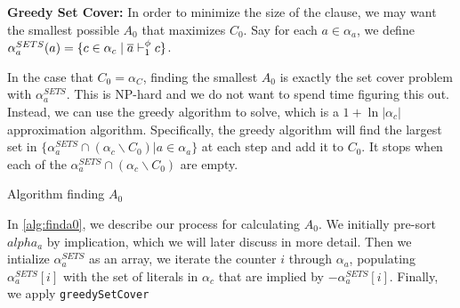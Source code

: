 \noindent \textbf{Greedy Set Cover:} %
In order to minimize the size of the clause, we may want the smallest possible $A_0$ that maximizes $C_0$. Say for each $a \in \alpha_a$, we define $\alpha_a^{SETS}(a) = \{ c \in \alpha_c \; | \; \overline{a} \vdash_1^\phi c\}$. 

In the case that $C_0 = \alpha_C$, finding the smallest $A_0$ is exactly the set cover problem with $\alpha_a^{SETS}$. This is NP-hard and we do not want to spend time figuring this out. Instead, we can use the greedy algorithm to solve, which is a $1 + \ln |\alpha_c|$ approximation algorithm. Specifically, the greedy algorithm will find the largest set in $\{\alpha_a^{SETS} \cap (\alpha_c \backslash C_0) | a \in \alpha_a \}$ at each step and add it to $C_0$. It stops when each of the $\alpha_a^{SETS} \cap (\alpha_c \backslash C_0)$ are empty.


\begin{algorithm}
    \caption{Algorithm finding $A_0$}\label{alg:finda0}
    \SetAlgoNoLine
\end{algorithm}

In \autoref{alg:finda0}, we describe our process for calculating $A_0$. We initially pre-sort $alpha_a$ by implication, which we will later discuss in more detail. Then we intialize $\alpha_a^{SETS}$ as an array, we iterate the counter $i$ through $\alpha_a$, populating $\alpha_a^{SETS}[i]$ with the set of literals in $\alpha_c$ that are implied by $-\alpha_a^{SETS}[i]$. Finally, we apply \texttt{greedySetCover}



